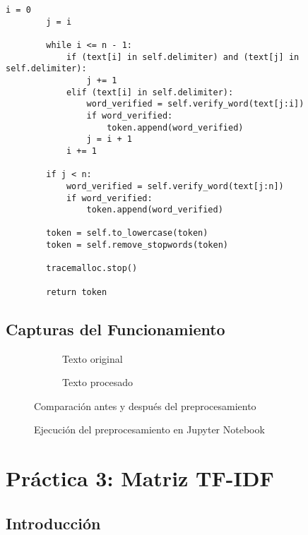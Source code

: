 \documentclass[12pt,a4paper]{article}
\begin{document}
\begin{lstlisting}[caption=Tokenizer con preprocesamiento]
        i = 0
        j = i
        
        while i <= n - 1:
            if (text[i] in self.delimiter) and (text[j] in self.delimiter):
                j += 1
            elif (text[i] in self.delimiter):
                word_verified = self.verify_word(text[j:i])
                if word_verified:
                    token.append(word_verified)
                j = i + 1
            i += 1

        if j < n:
            word_verified = self.verify_word(text[j:n])
            if word_verified:
                token.append(word_verified)

        token = self.to_lowercase(token)
        token = self.remove_stopwords(token)

        tracemalloc.stop()
        
        return token
\end{lstlisting}

\subsection{Capturas del Funcionamiento}

\begin{figure}[H]
    \centering
    \begin{subfigure}{0.45\textwidth}
        
        \caption{Texto original}
    \end{subfigure}
    \hfill
    \begin{subfigure}{0.45\textwidth}
        
        \caption{Texto procesado}
    \end{subfigure}
    \caption{Comparación antes y después del preprocesamiento}
\end{figure}

\begin{figure}[H]
    \centering
    
    \caption{Ejecución del preprocesamiento en Jupyter Notebook}
\end{figure}

\newpage

\section{Práctica 3: Matriz TF-IDF}

\subsection{Introducción}
\end{document}
